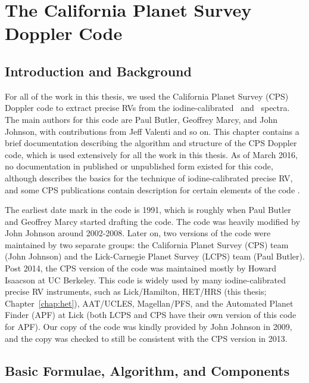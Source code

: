\chapter{The California Planet Survey Doppler
  Code}\label{chap:doppler} 

\section{Introduction and Background}

For all of the work in this thesis, we used the California Planet
Survey (CPS) Doppler code to extract precise RVs from the
iodine-calibrated \het\ and \keck\ spectra. The main authors for this
code are Paul Butler, Geoffrey Marcy, and John Johnson, with
contributions from Jeff Valenti and so on. This chapter contains a
brief documentation describing the algorithm and structure of the CPS
Doppler code, which is used extensively for all the work in this
thesis. As of March 2016, no documentation in published or unpublished
form existed for this code, although \cite{butler1996}
describes the basics for the technique of iodine-calibrated precise
RV, and some CPS publications contain description for certain elements
of the code \citep[e.g.,][]{2006ApJ...647..600J, 2009ApJ...696...75H,
2011ApJ...726...73H, 2011ApJS..197...26J}.

The earliest date mark in the code is 1991, which is roughly when Paul
Butler and Geoffrey Marcy started drafting the code. The code was
heavily modified by John Johnson around 2002-2008. Later on, two
versions of the code were maintained by two separate groups: the
California Planet Survey (CPS) team (John Johnson) and the
Lick-Carnegie Planet Survey (LCPS) team (Paul Butler). Post 2014, the
CPS version of the code was maintained mostly by Howard Isaacson at UC
Berkeley. This code is widely used by many iodine-calibrated precise
RV instruments, such as Lick/Hamilton, HET/HRS (this thesis;
Chapter~\ref{chap:het}), AAT/UCLES, Magellan/PFS, and the Automated
Planet Finder (APF) at Lick (both LCPS and CPS have their own version
of this code for APF). Our copy of the code was kindly provided by
John Johnson in 2009, and the copy was checked to still be consistent
with the CPS version in 2013.


\section{Basic Formulae, Algorithm, and Components}

